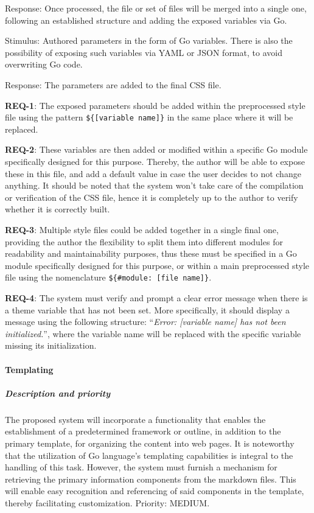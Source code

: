 Response: Once processed, the file or set of files will be merged into a
single one, following an established structure and adding the exposed
variables via Go.

Stimulus: Authored parameters in the form of Go variables. There is also
the possibility of exposing such variables via YAML or JSON format, to
avoid overwriting Go code.

Response: The parameters are added to the final CSS file.

\textbf{REQ-1}: The exposed parameters should be added within the
preprocessed style file using the pattern
\texttt{\$\{{[}variable\ name{]}\}} in the same place where it will be
replaced.

\textbf{REQ-2}: These variables are then added or modified within a
specific Go module specifically designed for this purpose. Thereby, the
author will be able to expose these in this file, and add a default
value in case the user decides to not change anything. It should be
noted that the system won't take care of the compilation or verification
of the CSS file, hence it is completely up to the author to verify
whether it is correctly built.

\textbf{REQ-3}: Multiple style files could be added together in a single
final one, providing the author the flexibility to split them into
different modules for readability and maintainability purposes, thus
these must be specified in a Go module specifically designed for this
purpose, or within a main preprocessed style file using the nomenclature
\texttt{\$\{\#module:\ {[}file\ name{]}\}}.

\textbf{REQ-4}: The system must verify and prompt a clear error message
when there is a theme variable that has not been set. More specifically,
it should display a message using the following structure:
``\emph{Error: {[}variable name{]} has not been initialized.}'', where
the variable name will be replaced with the specific variable missing
its initialization.

\paragraph{Templating}\label{par:templating}

\subparagraph{Description and
priority}\label{subpar:description-and-priority-2}

The proposed system will incorporate a functionality that enables the
establishment of a predetermined framework or outline, in addition to
the primary template, for organizing the content into web pages. It is
noteworthy that the utilization of Go language's templating capabilities
is integral to the handling of this task. However, the system must
furnish a mechanism for retrieving the primary information components
from the markdown files. This will enable easy recognition and
referencing of said components in the template, thereby facilitating
customization. Priority: MEDIUM.

